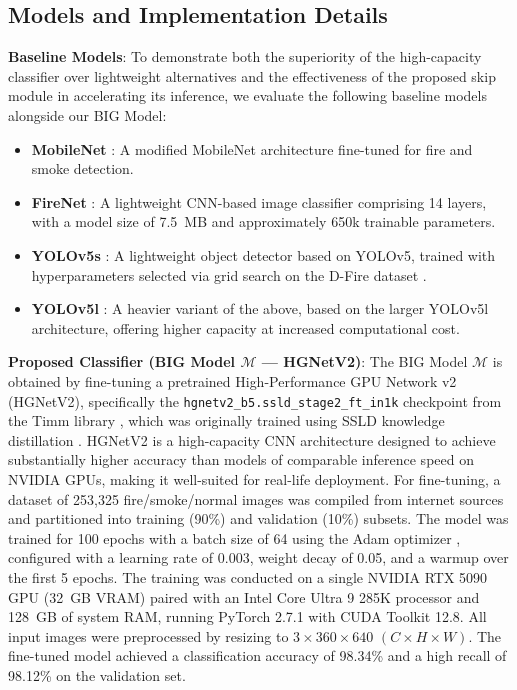 \documentclass[final,3p,times,twocolumn]{elsarticle}
\begin{document}
\subsection{Models and Implementation Details}\label{sec:baselines}

\textbf{Baseline Models}: To demonstrate both the superiority of the
high-capacity classifier over lightweight alternatives and the
effectiveness of the proposed skip module in accelerating its
inference, we evaluate the following baseline models alongside our BIG
Model:

\begin{itemize}
\item \textbf{MobileNet} \cite{mukhopadhyay2019fpga}: A modified
MobileNet architecture fine-tuned for fire and smoke detection.
\item \textbf{FireNet} \cite{jadon2019firenet}: A lightweight
CNN-based image classifier comprising 14 layers, with a model size of
7.5~MB and approximately 650k trainable parameters.
\item \textbf{YOLOv5s} \cite{de2023hybrid}: A lightweight object
detector based on YOLOv5, trained with hyperparameters selected via
grid search on the D-Fire dataset \cite{dfiredataset}.
\item \textbf{YOLOv5l} \cite{de2023hybrid}: A heavier variant of the
above, based on the larger YOLOv5l architecture, offering higher
capacity at increased computational cost.
\end{itemize}

\textbf{Proposed Classifier (BIG Model $\mathcal{M}$ --- HGNetV2)}: The
BIG Model $\mathcal{M}$ is obtained by fine-tuning a pretrained
High-Performance GPU Network v2 (HGNetV2), specifically the
\texttt{hgnetv2\_b5.ssld\_stage2\_ft\_in1k} checkpoint
\cite{hgnetv2timm:online} from the Timm library \cite{rw2019timm},
which was originally trained using SSLD knowledge distillation
\cite{cui2021beyond}. HGNetV2 \cite{hgnetv2PaddleCl7:online} is a
high-capacity CNN architecture designed to achieve substantially higher
accuracy than models of comparable inference speed on NVIDIA GPUs,
making it well-suited for real-life deployment. For fine-tuning, a
dataset of 253,325 fire/smoke/normal images was compiled from internet
sources and partitioned into training (90\%) and validation (10\%)
subsets. The model was trained for 100 epochs with a batch size of 64
using the Adam optimizer \cite{kingma2014adam}, configured with a
learning rate of 0.003, weight decay of 0.05, and a warmup over the
first 5 epochs. The training was conducted on a single NVIDIA RTX 5090
GPU (32~GB VRAM) paired with an Intel Core Ultra 9 285K processor and
128~GB of system RAM, running PyTorch 2.7.1 with CUDA Toolkit 12.8. All
input images were preprocessed by resizing to
$3 \times 360 \times 640$ $(C \times H \times W)$. The fine-tuned model
achieved a classification accuracy of 98.34\% and a high recall of
98.12\% on the validation set.
\end{document}
